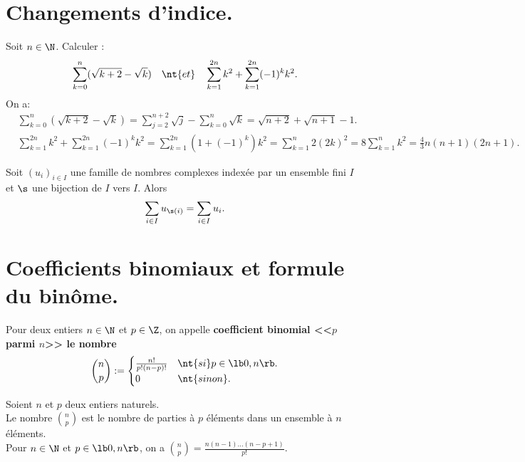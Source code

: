 \documentclass[11pt]{article}
\begin{document}
\pagebreak

\section{Changements d'indice.}

\begin{ex}{}{}
    Soit $n\in\N$. Calculer :
    \begin{equation*}
        \sum_{k=0}^n(\sqrt{k+2}-\sqrt{k})\quad\nt{et}\quad\sum_{k=1}^{2n}k^2+\sum_{k=1}^{2n}(-1)^kk^2.
    \end{equation*}
    \tcblower
    On a:
    \begin{align*}
        &\sum_{k=0}^n(\sqrt{k+2}-\sqrt{k})=\sum_{j=2}^{n+2}\sqrt{j}-\sum_{k=0}^n\sqrt{k}=\sqrt{n+2}+\sqrt{n+1}-1.\\
        &\sum_{k=1}^{2n}k^2+\sum_{k=1}^{2n}(-1)^kk^2=\sum_{k=1}^{2n}(1+(-1)^k)k^2=\sum_{k=1}^{n}2(2k)^2=8\sum_{k=1}^nk^2=\frac{4}{3}n(n+1)(2n+1).
    \end{align*}
\end{ex}

\begin{prop}{}{}
    Soit $(u_i)_{i\in I}$ une famille de nombres complexes indexée par un ensemble fini $I$ et $\s$ une bijection de $I$ vers $I$. Alors
    \begin{equation*}
        \sum_{i\in I}u_{\s(i)}=\sum_{i\in I}u_i.
    \end{equation*}
\end{prop}

\section{Coefficients binomiaux et formule du binôme.}

\begin{defi}{}{}
    Pour deux entiers $n\in\N$ et $p\in\Z$, on appelle \bf{coefficient binomial} <<$p$ parmi $n$>> le nombre
    \begin{equation*}
        \binom{n}{p}:=\begin{cases}
            \frac{n!}{p!(n-p)!} &\nt{si } p\in\lb0,n\rb.\\
            0&\nt{sinon}.
        \end{cases}
    \end{equation*}
\end{defi}

\begin{prop}{}{}
    Soient $n$ et $p$ deux entiers naturels.\\
    Le nombre $\binom{n}{p}$ est le nombre de parties à $p$ éléments dans un ensemble à $n$ éléments.\\
    Pour $n\in\N$ et $p\in\lb0,n\rb$, on a \Large$\binom{n}{p}=\frac{n(n-1)...(n-p+1)}{p!}$.
\end{prop}
\end{document}

